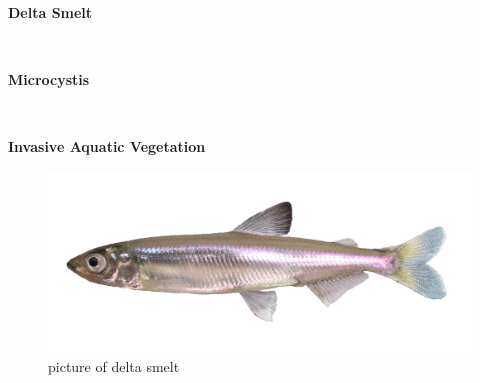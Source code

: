 \documentclass[
]{book}
\begin{document}
\begin{panel-grid}

\begin{columns-nocenter}

\begin{column800}

\textbf{Delta Smelt}

\end{column800}

\begin{column40}

~

\end{column40}

\begin{column800}

\textbf{Microcystis}

\end{column800}

\begin{column40}

~

\end{column40}

\begin{column800}

\textbf{Invasive Aquatic Vegetation}

\end{column800}

\end{columns-nocenter}

\begin{columns-nocenter}

\begin{column800}

\begin{figure}

{\centering \includegraphics[width=29.17in]{figures/delta_smelt} 

}

\caption{picture of delta smelt}\label{fig:unnamed-chunk-85}
\end{figure}


\end{column800}
\end{columns-nocenter}
\end{panel-grid}
\end{document}
